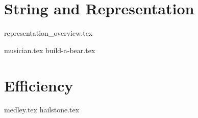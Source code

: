 \documentclass{exam}
\begin{document}
\section{String and Representation}
{representation_overview.tex}
\begin{questions}
    \newpage
    {musician.tex}
    \newpage
    {build-a-bear.tex}
    \newpage
\end{questions}

\section{Efficiency}
\begin{questions}
    \newpage
    {medley.tex}
    \newpage
    {hailstone.tex}
\end{questions}
\end{document}
